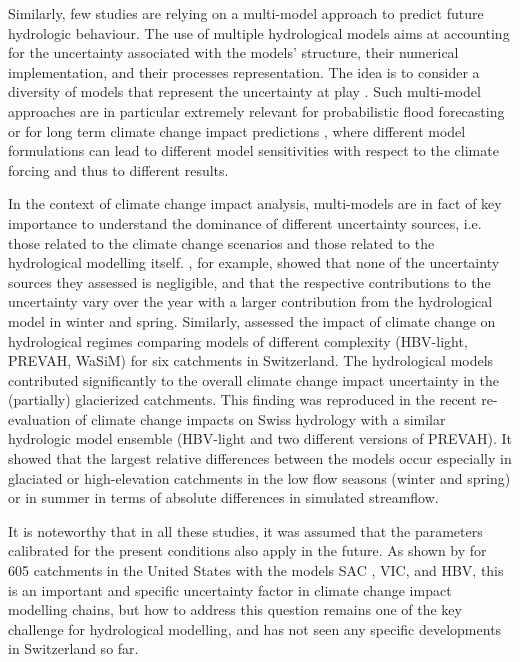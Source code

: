 \documentclass[10pt,a4paper]{article}
\begin{document}
Similarly, few studies are relying on a multi-model approach to predict future hydrologic behaviour. The use of multiple hydrological models aims at accounting for the uncertainty associated with the models' structure, their numerical implementation, and their processes representation. The idea is to consider a diversity of models that represent the uncertainty at play \citep{Babel2019}. Such multi-model approaches are in particular extremely relevant for probabilistic flood forecasting \citep{Kauffeldt2016} or for long term climate change impact predictions \citep{Kobierska2011, Kobierska2013, Andrianaki2019}, where different model formulations can lead to different model sensitivities with respect to the climate forcing and thus to different results. 

In the context of climate change impact analysis, multi-models are in fact of key importance to understand the dominance of different uncertainty sources, i.e. those related to the climate change scenarios and those related to the hydrological modelling itself. \citet{Bosshard2013a}, for example, showed that none of the uncertainty sources they assessed is negligible, and that the respective contributions to the uncertainty vary over the year with a larger contribution from the hydrological model in winter and spring. Similarly, \citet{Addor2014} assessed the impact of climate change on hydrological regimes comparing models of different complexity (HBV-light, PREVAH, WaSiM) for six catchments in Switzerland. The hydrological models contributed significantly to the overall climate change impact uncertainty in the (partially) glacierized catchments. This finding was reproduced in the recent re-evaluation of climate change impacts on Swiss hydrology \citep[Hydro-CH2018,][]{FOEN2021} with a similar hydrologic model ensemble (HBV-light and two different versions of PREVAH). It showed that the largest relative differences between the models occur especially in glaciated or high-elevation catchments in the low flow seasons (winter and spring) or in summer in terms of absolute differences in simulated streamflow.

It is noteworthy that in all these studies, it was assumed that the parameters calibrated for the present conditions also apply in the future. As shown by \citet{Melsen2021} for 605 catchments in the United States with the models SAC \citep[Sacramento Soil Moisture Accounting model;][]{Burnash1973}, VIC, and HBV, this is an important and specific uncertainty factor in climate change impact modelling chains, but how to address this question remains one of the key challenge for hydrological modelling, and has not seen any specific developments in Switzerland so far. 
\end{document}
